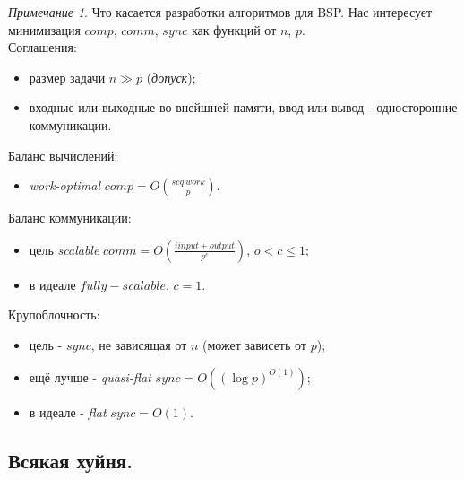 \documentclass[a4paper]{article}
\theoremstyle{indented}
\theoremstyle{definition}
\theoremstyle{remark}
\newtheorem{remark}{Примечание}
\begin{document}
\begin{remark}
    Что касается разработки алгоритмов для BSP. Нас интересует минимизация $comp$, $comm$, $sync$ как функций от $n$, $p$. \\
    
    Соглашения: 

    \begin{itemize}
        \item размер задачи $n \gg p$ (\textit{допуск}); 
        \item входные или выходные во внейшней памяти, ввод или вывод - односторонние коммуникации.
    \end{itemize}

    Баланс вычислений:

    \begin{itemize}
        \item \textit{work-optimal} $comp=O(\frac{seq \: work}{p})$.
    \end{itemize}

    Баланс коммуникации:

    \begin{itemize}
        \item цель \textit{scalable} $comm = O(\frac{iinput+output}{p^c})$, $o<c\leq 1$; 
        \item в идеале $fully-scalable$, $c=1$.
    \end{itemize}

    Крупоблочность:

    \begin{itemize}
        \item цель - $sync$, не зависящая от $n$ (может зависеть от $p$); 
        \item ещё лучше - \textit{quasi-flat} $sync=O((\log p)^{O(1)})$; 
        \item в идеале - \textit{flat} $sync=O(1)$. 
    \end{itemize}
\end{remark}

\subsection{Всякая хуйня.}
\end{document}
